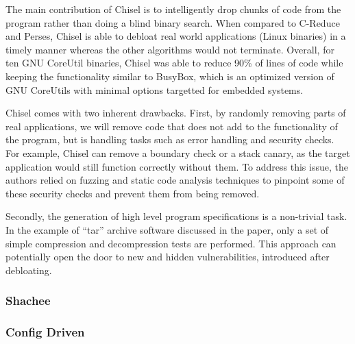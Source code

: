 The main contribution of Chisel is to intelligently drop chunks of code from the program rather than doing a blind binary search. When compared to C-Reduce and Perses, Chisel is able to debloat real world applications (Linux binaries) in a timely manner whereas the other algorithms would not terminate. Overall, for ten GNU CoreUtil binaries, Chisel was able to reduce 90\% of lines of code while keeping the functionality similar to BusyBox, which is an optimized version of GNU CoreUtils with minimal options targetted for embedded systems.

Chisel comes with two inherent drawbacks. First, by randomly removing parts of real applications, we will remove code that does not add to the functionality of the program, but is handling tasks such as error handling and security checks.
For example, Chisel can remove a boundary check or a stack canary, as the target application would still function correctly without them. To address this issue, the authors relied on fuzzing and static code analysis techniques to pinpoint some of these
security checks and prevent them from being removed.

Secondly, the generation of high level program specifications is a non-trivial task. In the example of ``tar'' archive software discussed in the paper, only a set of simple compression and decompression tests are performed. This approach can potentially open the door to new and hidden vulnerabilities, introduced after debloating.

\subsubsection{Shachee}

\subsubsection{Config Driven}
